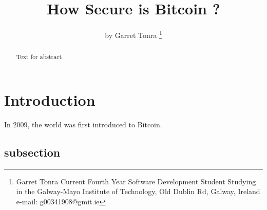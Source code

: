 \documentclass[report]{IEEEtran}
\begin{document}
\title{How Secure is Bitcoin ? }
\author{by Garret Tonra %
\thanks{Garret Tonra Current Fourth Year
Software Development Student Studying in the Galway-Mayo Institute of Technology, Old Dublin Rd, Galway, Ireland 
e-mail: g00341908@gmit.ie}%
}

\maketitle

\begin{abstract}
Text for abstract
\end{abstract}


\section{Introduction}
In 2009, the world was first introduced to Bitcoin. 
\subsection{subsection}
\end{document}
